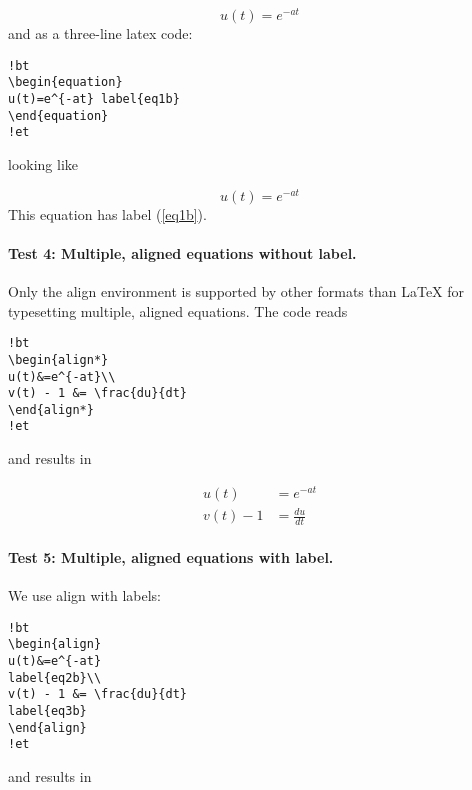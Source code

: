 \documentclass[%
oneside,                 %
final,                   %
10pt]{article}
\begin{document}
\begin{equation} u(t)=e^{-at} \label{eq1}\end{equation}
and as a three-line latex code:

\begin{Verbatim}[numbers=none,fontsize=\fontsize{9pt}{9pt},baselinestretch=0.95]
!bt
\begin{equation}
u(t)=e^{-at} label{eq1b}
\end{equation}
!et
\end{Verbatim}
looking like

\begin{equation}
u(t)=e^{-at} \label{eq1b}
\end{equation}
This equation has label (\ref{eq1b}).


\paragraph{Test 4: Multiple, aligned equations without label.}
Only the align
environment is supported by other formats than {\LaTeX} for typesetting
multiple, aligned equations. The code reads

\begin{Verbatim}[numbers=none,fontsize=\fontsize{9pt}{9pt},baselinestretch=0.95]
!bt
\begin{align*}
u(t)&=e^{-at}\\ 
v(t) - 1 &= \frac{du}{dt}
\end{align*}
!et
\end{Verbatim}
and results in

\begin{align*}
u(t)&=e^{-at}\\ 
v(t) - 1 &= \frac{du}{dt}
\end{align*}

\paragraph{Test 5: Multiple, aligned equations with label.}
We use align with
labels:

\begin{Verbatim}[numbers=none,fontsize=\fontsize{9pt}{9pt},baselinestretch=0.95]
!bt
\begin{align}
u(t)&=e^{-at}
label{eq2b}\\ 
v(t) - 1 &= \frac{du}{dt}
label{eq3b}
\end{align}
!et
\end{Verbatim}
and results in
\end{document}
